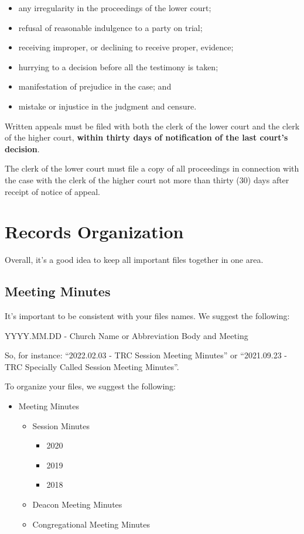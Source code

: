 \documentclass[
]{book}
\providecommand{\tightlist}{%
  \setlength{\itemsep}{0pt}\setlength{\parskip}{0pt}}
\begin{document}
\begin{itemize}
\tightlist
\item
  any irregularity in the proceedings of the lower court;
\item
  refusal of reasonable indulgence to a party on trial;
\item
  receiving improper, or declining to receive proper, evidence;
\item
  hurrying to a decision before all the testimony is taken;
\item
  manifestation of prejudice in the case; and
\item
  mistake or injustice in the judgment and censure.
\end{itemize}

Written appeals must be filed with both the clerk of the lower court and the clerk of the higher court, \textbf{within thirty days of notification of the last court's decision}.

The clerk of the lower court must file a copy of all proceedings in connection with the case with the clerk of the higher court not more than thirty (30) days after receipt of notice of appeal.

\hypertarget{records-organization}{%
\chapter{Records Organization}\label{records-organization}}

Overall, it's a good idea to keep all important files together in one area.

\hypertarget{meeting-minutes}{%
\section{Meeting Minutes}\label{meeting-minutes}}

It's important to be consistent with your files names. We suggest the following:

YYYY.MM.DD - Church Name or Abbreviation \textbar{} Body and Meeting

So, for instance: ``2022.02.03 - TRC Session Meeting Minutes'' or ``2021.09.23 - TRC Specially Called Session Meeting Minutes''.

To organize your files, we suggest the following:

\begin{itemize}
\tightlist
\item
  Meeting Minutes

  \begin{itemize}
  \tightlist
  \item
    Session Minutes

    \begin{itemize}
    \tightlist
    \item
      2020
    \item
      2019
    \item
      2018
    \end{itemize}
  \item
    Deacon Meeting Minutes
  \item
    Congregational Meeting Minutes
  \end{itemize}
\end{itemize}
\end{document}
